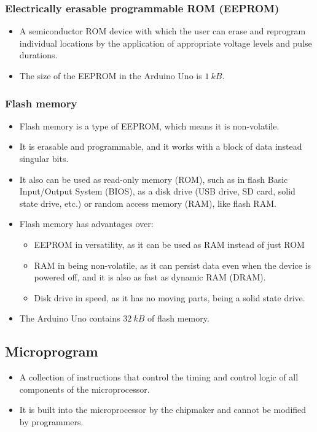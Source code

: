 \documentclass[11pt]{article}
\begin{document}
\subsubsection{Electrically erasable programmable ROM (EEPROM)}
\label{sec:org28239e1}
\begin{itemize}
\item A semiconductor ROM device with which the user can erase and reprogram individual locations by the application of appropriate voltage levels and pulse durations.
\item The size of the EEPROM in the Arduino Uno is \(\qty{1}{kB}\).
\end{itemize}

 \newpage

\subsubsection{Flash memory}
\label{sec:org23d4fbc}
\begin{itemize}
\item Flash memory is a type of EEPROM, which means it is non-volatile.
\item It is erasable and programmable, and it works with a block of data instead singular bits.
\item It also can be used as read-only memory (ROM), such as in flash Basic Input/Output System (BIOS), as a disk drive (USB drive, SD card, solid state drive, etc.) or random access memory (RAM), like flash RAM.
\item Flash memory has advantages over:
\begin{itemize}
\item EEPROM in versatility, as it can be used as RAM instead of just ROM
\item RAM in being non-volatile, as it can persist data even when the device is powered off, and it is also as fast as dynamic RAM (DRAM).
\item Disk drive in speed, as it has no moving parts, being a solid state drive.
\end{itemize}
\item The Arduino Uno contains \(\qty{32}{kB}\) of flash memory.
\end{itemize}

\subsection{Microprogram}
\label{sec:orgcc7caa4}
\begin{itemize}
\item A collection of instructions that control the timing and control logic of all components of the microprocessor.
\item It is built into the microprocessor by the chipmaker and cannot be modified by programmers.
\end{itemize}
\end{document}
